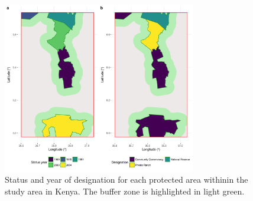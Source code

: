 \documentclass[12pt,a4paper, twoside, english]{article}
\begin{document}

\begin{figure}[H]
  \centering
  \includegraphics[width=0.75\textwidth]{figures/Status_Temp_WDPA_KEN.png}
  \caption[Status \& Temporal development of PAs of Laikipia]{Status and year of designation for each protected area withinin the study area in Kenya. The buffer zone is highlighted in light green.}
  \label{fig:status_temp_wdpa_ken}
\end{figure}



\end{document}

